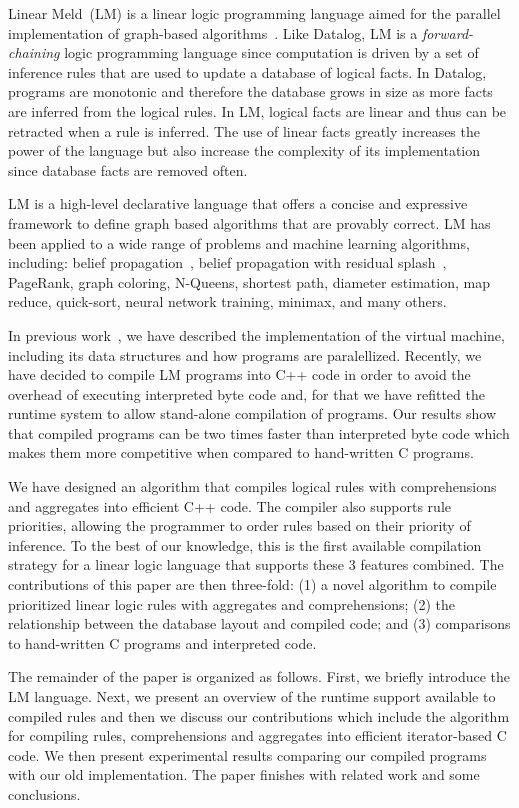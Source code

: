 Linear Meld~(LM) is a linear logic programming language
aimed for the parallel implementation of graph-based
algorithms~\cite{cruz-iclp14}. Like Datalog, LM is
a \emph{forward-chaining} logic programming language since computation is driven by a set of
inference rules that are used to update a database of logical facts. In Datalog,
programs are monotonic and therefore the database grows in size as more facts are
inferred from the logical rules. In LM, logical
facts are linear and thus can be retracted when a rule is inferred. The use of linear
facts greatly increases the power of the language but also increase the
complexity of its implementation since database facts are removed often.

LM is a high-level declarative language that offers a concise and
expressive framework to define graph based algorithms that are provably correct.
LM has been applied to a wide range of problems and machine learning
algorithms, including: belief propagation~\cite{Gonzalez+al:aistats09paraml},
belief propagation with residual splash~\cite{Gonzalez+al:aistats09paraml},
PageRank, graph coloring, N-Queens, shortest path, diameter estimation,
map reduce, quick-sort, neural network training, minimax, and many others.

In previous work~\cite{cruz-ppdp14}, we have described the implementation of the
virtual machine, including its data structures and how programs are
paralellized. Recently, we have decided to compile LM programs into C++ code in
order to avoid the overhead of executing interpreted byte code and, for that we have refitted
the runtime system to allow stand-alone compilation of programs.
Our results show that compiled programs can be two times faster than
interpreted byte code which makes them more competitive when compared to hand-written C
programs.

We have designed an algorithm that compiles logical rules with comprehensions and
aggregates into efficient C++ code. The compiler also supports rule priorities, allowing
the programmer to order rules based on their priority of inference. To the best
of our knowledge, this is the first available compilation strategy for a linear logic
language that supports these 3 features combined. The
contributions of this paper are then three-fold: (1) a novel algorithm to compile
prioritized linear logic rules with aggregates and comprehensions; (2) the relationship
between the database layout and compiled code; and (3) comparisons to
hand-written C programs and interpreted code.

The remainder of the paper is organized as follows. First, we briefly introduce
the LM language. Next, we present an overview of the runtime support available
to compiled rules and then we discuss our contributions which include the
algorithm for compiling rules, comprehensions and aggregates into efficient
iterator-based C code. We then present experimental results comparing our
compiled programs with our old implementation. The paper finishes with related
work and some conclusions.
